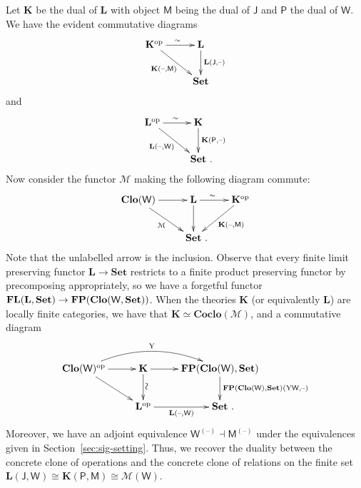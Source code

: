 \documentclass[11pt, a4paper, twoside,leqno]{amsart}
\newcommand{\cat}[1]{\mathbf{#1}}
\newcommand{\thg}{{\mathord{\text{--}}}}
\newcommand{\cd}[2][]{\vcenter{\hbox{\xymatrix#1{#2}}}}
\numberwithin{equation}{section}
\theoremstyle{plain}
\theoremstyle{definition}
\newcommand{\Set}{\cat{Set}}
\DeclareMathOperator{\FP}{\bf FP}
\DeclareMathOperator{\FL}{\bf FL}
\begin{document}
Let \(\cat{K}\) be the dual of \(\cat{L}\) with object \(\mathsf{M}\)
being the dual of \(\mathsf{J}\) and \(\mathsf{P}\) the dual of
\(\mathsf{W}\). 
We have the evident commutative diagrams
\begin{equation}
  \label{eq:2}
   \cd{
    {\cat{K}^{\mathrm{op}}} \ar[dr]_-{\cat{K}(\thg,\mathsf{M})} \ar[r]^{\sim} & {\cat{L}} \ar[d]^-{\cat{L}(\mathsf{J},\thg)}\\
& {\Set}
  }
\end{equation}
and
\begin{equation}
  \label{eq:3}
     \cd{
    {\cat{L}^{\mathrm{op}}} \ar[dr]_-{\cat{L}(\thg,\mathsf{W})} \ar[r]^{\sim} & {\cat{K}} \ar[d]^-{\cat{K}(\mathsf{P},\thg)}\\
& {\Set}\rlap{ .}
  }
\end{equation}
Now consider the functor \(\mathcal{M}\) making the following diagram commute:
\begin{equation}
  \label{eq:1}
  \cd{
    {\cat{Clo}(\mathsf{W})} \ar[dr]_-{\mathcal{M}} \ar[r]
    & {\cat{L}} \ar[r]^(.4){\sim}    \ar[d]
    & \ar[dl]^-{\cat{K}(\thg,\mathsf{M})} {\cat{K}^{\mathrm{op}}} \\
& {\Set}\rlap{ .}
  }
\end{equation}
Note that the unlabelled arrow is the inclusion. Observe that every finite limit
preserving functor \(\cat{L} \rightarrow \Set\) 
restricts to a finite product preserving functor by precomposing
appropriately, so we have a forgetful functor
\(\FL(\cat{L},\Set)\rightarrow \FP(\cat{Clo}(\mathsf{W},\Set))\). When the theories \(\cat{K}\) (or equivalently \(\cat{L}\)) are
locally finite categories, we have that \(\cat{K} \simeq
\cat{Coclo}(\mathcal{M})\), and a commutative diagram 
\begin{equation}
  \label{eq:4}
  \cd{
    {\cat{Clo}(\mathsf{W})^{\mathrm{op}}} \ar@/_-1.5pc/[rr]^{\mathrm{Y}
    }
    \ar[dr]
    \ar[r]
    & {\cat{K}} \ar[r]^-{} \ar[d]^(.4)*[@d]{\sim} &  {\FP} {(\cat{Clo}(\mathsf{W}),\Set)} \ar[d]^-{\FP(\cat{Clo}(\mathsf{W}),\Set)(\mathrm{Y}\mathsf{W},\thg
      )}    
    \\
    & {\cat{L}^{\mathrm{op}}} \ar[r]_-{\cat{L}(\thg,\mathsf{W})} & {\Set}
    \rlap{ .}
  }
\end{equation}
 Moreover, we have an adjoint equivalence
\(\mathsf{W}^{(\thg)} \dashv \mathsf{M}^{(\thg)}\) under the
equivalences given in Section~\ref{sec:sig-setting}. Thus, we recover the duality between the concrete clone of operations
and
the concrete clone of relations on the finite set
\(\cat{L}(\mathsf{J},\mathsf{W})\cong \cat{K}(\mathsf{P},\mathsf{M})
\cong  \mathcal{M}(\mathsf{W})\).
\end{document}
